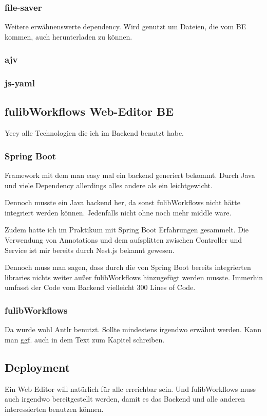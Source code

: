 \subsubsection{file-saver}
Weitere erwähnenswerte dependency.
Wird genutzt um Dateien, die vom BE kommen, auch herunterladen zu können.

\subsubsection{ajv}

\subsubsection{js-yaml}


\subsection{fulibWorkflows Web-Editor BE}\label{subsubsec:backend}
Yeey alle Technologien die ich im Backend benutzt habe.

\subsubsection{Spring Boot}
Framework mit dem man easy mal ein backend generiert bekommt.
Durch Java und viele Dependency allerdings alles andere als ein leichtgewicht.

Dennoch musste ein Java backend her, da sonst fulibWorkflows nicht hätte integriert werden können.
Jedenfalls nicht ohne noch mehr middle ware.

Zudem hatte ich im Praktikum mit Spring Boot Erfahrungen gesammelt.
Die Verwendung von Annotations und dem aufsplitten zwischen Controller und Service ist mir bereits
durch Nest.js bekannt gewesen.

Dennoch muss man sagen, dass durch die von Spring Boot bereits integrierten libraries nichts weiter
außer fulibWorkflows hinzugefügt werden musste.
Immerhin umfasst der Code vom Backend vielleicht 300 Lines of Code.

\subsubsection{fulibWorkflows}
Da wurde wohl \ac{Antlr} benutzt.
Sollte mindestens irgendwo erwähnt werden.
Kann man ggf. auch in dem Text zum Kapitel schreiben.

\subsection{Deployment}\label{subsec:deployment}
Ein Web Editor will natürlich für alle erreichbar sein.
Und fulibWorkflows muss auch irgendwo bereitgestellt werden, damit es das Backend und alle anderen
interessierten benutzen können.

